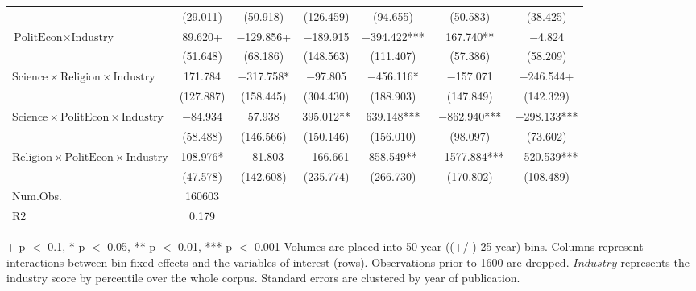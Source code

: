 \begin{table}
\begin{threeparttable}
\begin{tabular}[t]{lcccccc}
 & (\num{29.011}) & (\num{50.918}) & (\num{126.459}) & (\num{94.655}) & (\num{50.583}) & (\num{38.425})\\
$\text{PolitEcon} \times \text{Industry}$ & \num{89.620}+ & \num{-129.856}+ & \num{-189.915} & \num{-394.422}*** & \num{167.740}** & \num{-4.824}\\
 & (\num{51.648}) & (\num{68.186}) & (\num{148.563}) & (\num{111.407}) & (\num{57.386}) & (\num{58.209})\\
$\text{Science} \times \text{Religion} \times \text{Industry}$ & \num{171.784} & \num{-317.758}* & \num{-97.805} & \num{-456.116}* & \num{-157.071} & \num{-246.544}+\\
 & (\num{127.887}) & (\num{158.445}) & (\num{304.430}) & (\num{188.903}) & (\num{147.849}) & (\num{142.329})\\
$\text{Science} \times \text{PolitEcon} \times \text{Industry}$ & \num{-84.934} & \num{57.938} & \num{395.012}** & \num{639.148}*** & \num{-862.940}*** & \num{-298.133}***\\
 & (\num{58.488}) & (\num{146.566}) & (\num{150.146}) & (\num{156.010}) & (\num{98.097}) & (\num{73.602})\\
$\text{Religion} \times \text{PolitEcon} \times \text{Industry}$ & \num{108.976}* & \num{-81.803} & \num{-166.661} & \num{858.549}** & \num{-1577.884}*** & \num{-520.539}***\\
 & (\num{47.578}) & (\num{142.608}) & (\num{235.774}) & (\num{266.730}) & (\num{170.802}) & (\num{108.489})\\
\midrule
Num.Obs. & \num{160603} &  &  &  &  & \\
R2 & \num{0.179} &  &  &  &  & \\
\bottomrule
\end{tabular}
\begin{tablenotes}
\item + p $<$ 0.1, * p $<$ 0.05, ** p $<$ 0.01, *** p $<$ 0.001 Volumes are placed into 50 year ((+/-) 25 year) bins. Columns represent interactions between bin fixed effects and the variables of interest (rows). Observations prior to 1600 are dropped. $Industry$ represents the industry score by percentile over the whole corpus. Standard errors are clustered by year of publication.
\end{tablenotes}
\end{threeparttable}
\end{table}
